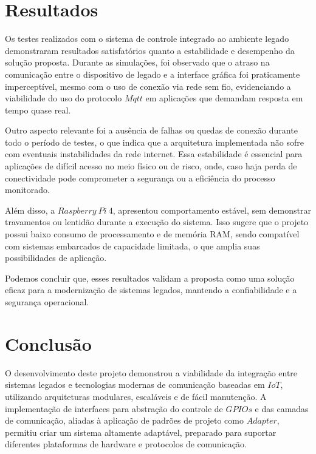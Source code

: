 \documentclass{ecatfg}
\begin{document}
\section{Resultados}
Os testes realizados com o sistema de controle integrado ao ambiente legado demonstraram resultados satisfatórios quanto a estabilidade e desempenho da solução proposta. Durante as simulações, foi observado que o atraso na comunicação entre o dispositivo de legado e a interface gráfica foi praticamente imperceptível, mesmo com o uso de conexão via rede sem fio, evidenciando a viabilidade do uso do protocolo $Mqtt$ em aplicações que demandam resposta em tempo quase real. \par

Outro aspecto relevante foi a ausência de falhas ou quedas de conexão durante todo o período de testes, o que indica que a arquitetura implementada não sofre com eventuais instabilidades da rede internet. Essa estabilidade é essencial para aplicações de difícil acesso no meio físico ou de risco, onde, caso haja perda de conectividade pode comprometer a segurança ou a eficiência do processo monitorado. \par

Além disso, a $Raspberry\ Pi\ 4$, apresentou comportamento estável, sem demonstrar travamentos ou lentidão durante a execução do sistema. Isso sugere que o projeto possui baixo consumo de processamento e de memória RAM, sendo compatível com sistemas embarcados de capacidade limitada, o que amplia suas possibilidades de aplicação. \par

Podemos concluir que, esses resultados validam a proposta como uma solução eficaz para a modernização de sistemas legados, mantendo a confiabilidade e a segurança operacional. \par



\section{Conclusão}
O desenvolvimento deste projeto demonstrou a viabilidade da integração entre sistemas legados e tecnologias modernas de comunicação baseadas em $IoT$, utilizando arquiteturas modulares, escaláveis e de fácil manutenção. A implementação de interfaces para abstração do controle de $GPIOs$ e das camadas de comunicação, aliadas à aplicação de padrões de projeto como $Adapter$, permitiu criar um sistema altamente adaptável, preparado para suportar diferentes plataformas de hardware e protocolos de comunicação.\par
\end{document}
